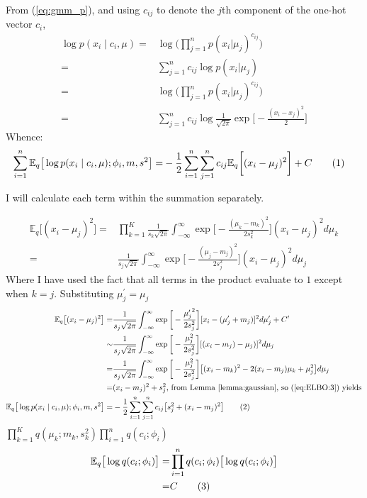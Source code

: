 \documentclass[]{article}
\newcommand{\Expectation} {\mathbb{E}}
\newcommand\numberthis    {\addtocounter{equation}{1}\tag{\theequation}}
\begin{document}
From  (\ref{eq:gmm_p}), and using $c_{ij}$ to denote the $j$th component of the one-hot vector $c_i$,
\begin{align*}
	\log{p(x_i\mid c_i,\mu)} =& \log{\big(\prod_{j=1}^{n} p(x_i|\mu_j)^{c_{ij}}\big)}\\
	=&\sum_{j=1}^{n}c_{ij} \log{p(x_i|\mu_j)}\\
	=& \log{\big(\prod_{j=1}^{n} p(x_i|\mu_j)^{c_{ij}}\big)}\\
	=&\sum_{j=1}^{n}c_{ij} \log{\frac{1}{\sqrt{2\pi}} \exp{\big[-\frac{(x_i-x_j)^2}{2}\big]}}
\end{align*}
Whence:
\begin{align*}
	\sum_{i=1}^{n}\Expectation_q\big[\log{p(x_i\mid c_i,\mu);\phi_i,m,s^2}\big] =& - \frac{1}{2}  \sum_{i=1}^{n} \sum_{j=1}^{n} c_{ij} \Expectation_q\bigg[ (x_i-\mu_j)^2\bigg] + C \numberthis \label{eq:ELBO:3}
\end{align*}

I will calculate each term within the summation separately.  

\begin{align*}
	\Expectation_q\big[(x_i-\mu_j)^2\big]
	=& \prod_{k=1}^{K}\frac{1}{s_k\sqrt{2\pi}}  \int_{-\infty}^{\infty} \exp{\bigg[-\frac{(\mu_k-m_k)^2}{2 s_k^2}\bigg]}(x_i-\mu_j)^2 d \mu_k\\
	=& \frac{1}{s_j\sqrt{2\pi}}  \int_{-\infty}^{\infty} \exp{\bigg[-\frac{(\mu_j-m_j)^2}{2 s_j^2}\bigg]}(x_i-\mu_j)^2 d \mu_j
\end{align*}
Where I have used the fact that all terms in the product evaluate to $1$ except when $k=j$. Substituting $\mu^\prime_j=\mu_j$
\begin{align*}
	\Expectation_q\big[(x_i-\mu_j)^2\big]=&\frac{1}{s_j\sqrt{2\pi}}  \int_{-\infty}^{\infty} \exp{\bigg[-\frac{{\mu^\prime_j}^2}{2 s_j^2}\bigg]}[x_i-(\mu^\prime_j+m_j)]^2 d \mu^\prime_j + C^\prime \\
	\sim&\frac{1}{s_j\sqrt{2\pi}}  \int_{-\infty}^{\infty} \exp{\bigg[-\frac{\mu_j^2}{2 s_j^2}\bigg]}[(x_i-m_j)-\mu_j)]^2 d \mu_j\\
	=&\frac{1}{s_j\sqrt{2\pi}}  \int_{-\infty}^{\infty} \exp{\bigg[-\frac{\mu_j^2}{2 s_j^2}\bigg]}\big[(x_i-m_k)^2-2(x_i-m_j)\mu_k+\mu_j^2\big] d \mu_j\\
	=& (x_i-m_j)^2 + s_j^2 \text{, from Lemma \ref{lemma:gaussian}, so  (\ref{eq:ELBO:3}) yields}\\
	\Expectation_q\big[\log{p(x_i\mid c_i,\mu);\phi_i,m,s^2}\big] =&  -\frac{1}{2} \sum_{i=1}^{n} \sum_{j=1}^{n}c_{ij} \big[s_j^2 + (x_i-m_j)^2 \big] \numberthis \label{eq:ELBO:3F}
\end{align*}
$\prod_{k=1}^{K} q(\mu_k;m_k,s_k^2) \prod_{i=1}^{n}q(c_i;\phi_i)$
\begin{align*}
	\Expectation_q\big[\log{q(c_i;\phi_i)}\big] =& \prod_{i=1}^{n}q(c_i;\phi_i) \big[\log{q(c_i;\phi_i)}\big]\\
	=& C \numberthis \label{eq:ELBO:4}
\end{align*}
\end{document}
